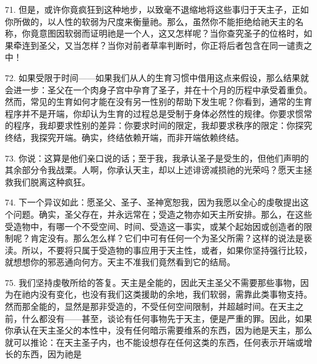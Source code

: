 71. 但是，或许你竟疯狂到这种地步，以致毫不退缩地将这些事归于天主子，正如你所做的，以人性的软弱为尺度来衡量祂。那么，虽然你不能拒绝给祂天主的名称，你竟意图因软弱而证明祂是一个人，这又怎样呢？当你查究圣子的位格时，如果牵连到圣父，又当怎样？当你对前者草率判断时，你正将后者包含在同一谴责之中！\par

72. 如果受限于时间——如果我们从人的生育习惯中借用这点来假设，那么结果就会进一步：圣父在一个肉身子宫中孕育了圣子，并在十个月的历程中承受着重负。然而，常见的生育如何才能在没有另一性别的帮助下发生呢？你看到，通常的生育程序并不是开端，你却认为生育的过程总是受制于身体必然性的规律。你要求惯常的程序，我却要求性别的差异：你要求时间的限定，我却要求秩序的限定：你探究终结，我探究开端。确实，终结依赖开端，而非开端依赖终结。\par

73. 你说：这算是他们亲口说的话；至于我，我承认圣子是受生的，但他们声明的其余部分令我战栗。人啊，你承认天主，却以上述诽谤减损祂的光荣吗？愿天主拯救我们脱离这种疯狂。\par

\par

74. 下一个异议如此：愿圣父、圣子、圣神宽恕我，因为我愿以全心的虔敬提出这个问题。确实，圣父存在，并永远常在；受造之物亦如天主所安排。那么，在这些受造物中，有哪一个不受空间、时间、受造这一事实，或某个起始因或创造者的限制呢？肯定没有。那么怎么样？它们中可有任何一个为圣父所需？这样的说法是亵渎。所以，不要将只属于受造物的事应用于天主性，或者，如果你坚持强行比较，就想想你的邪恶通向何方。天主不准我们竟然看到它的结局。\par

75. 我们坚持虔敬所给的答复。天主是全能的，因此天主圣父不需要那些事物，因为在祂内没有变化，也没有我们这类援助的余地，我们软弱，需靠此类事物支持。然而那全能的，显然是那非受造的，不受任何空间限制，并超越时间。在天主之前，什么都没有——甚至，谈论有任何事物先于天主，便是严重的罪。因此，如果你承认在天主圣父的本性中，没有任何暗示需要维系的东西，因为祂是天主，那么就可以推论：在天主圣子内，也不能设想存在任何这类的东西，任何表示开端或增长的东西，因为祂是\par

